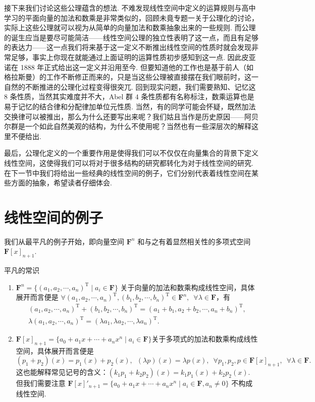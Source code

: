 接下来我们讨论这些公理蕴含的想法. 不难发现线性空间中定义的运算规则与高中学习的平面向量的加法和数乘是非常类似的，回顾未竟专题一关于公理化的讨论，实际上这些公理就可以视为从简单的向量加法和数乘抽象出来的一些规则. 而公理的诞生应当是要尽可能简洁——线性空间公理的独立性表明了这一点，而且有足够的表达力——这一点我们将来基于这一定义不断推出线性空间的性质时就会发现非常足够，事实上你现在就能通过上面证明的运算性质初步感知到这一点. 因此皮亚诺在 1888 年正式给出这一定义并沿用至今. 但要知道他的工作也是基于前人（如格拉斯曼）的工作不断修正而来的，只是当这些公理被直接摆在我们眼前时，这一自然的不断推进的公理化过程变得很突兀. 回到现实问题，我们需要熟知、记忆这 $8$ 条性质，当然其实难度并不大，Abel 群 $4$ 条性质都有名称标注，数乘运算也是易于记忆的结合律和分配律加单位元性质. 当然，有的同学可能会怀疑，既然加法交换律可以被推出，那么为什么还要写出来呢？我们姑且当作是历史原因——阿贝尔群是一个如此自然美观的结构，为什么不使用呢？当然也有一些深层次的解释这里不便给出.

最后，公理化定义的一个重要作用是使得我们可以不仅仅在向量集合的背景下定义线性空间，这使得我们可以将对于很多结构的研究都转化为对于线性空间的研究. 在下一节中我们将给出一些经典的线性空间的例子，它们分别代表着线性空间在某些方面的抽象，希望读者仔细体会.

\section{线性空间的例子}

我们从最平凡的例子开始，即向量空间 $\mathbf{F}^n$ 和与之有着显然相关性的多项式空间 $\mathbf{F}[x]_{n+1}$.
\begin{example}{平凡的常识}{}
    \begin{enumerate}
        \item $\mathbf{F}^n = \{(a_1,a_2,\cdots,a_n)^\mathrm{T} \mid a_i \in \mathbf{F}\}$ 关于向量的加法和数乘构成线性空间，具体展开而言便是 $\forall (a_1,a_2,\cdots,a_n)^\mathrm{T},(b_1,b_2,\cdots,b_n)^\mathrm{T} \in \mathbf{F}^n, \enspace \forall \lambda \in \mathbf{F}$，有
        \begin{gather*}
            (a_1,a_2,\cdots,a_n)^\mathrm{T} + (b_1,b_2,\cdots,b_n)^\mathrm{T} = (a_1+b_1,a_2+b_2,\cdots,a_n+b_n)^\mathrm{T},\\
            \lambda(a_1,a_2,\cdots,a_n)^\mathrm{T} = (\lambda a_1,\lambda a_2,\cdots,\lambda a_n)^\mathrm{T}.
        \end{gather*}
        \item $\mathbf{F}[x]_{n+1}=\{a_0+a_1x+\cdots+a_nx^n \mid a_i\in\mathbf{F}\}$关于多项式的加法和数乘构成线性空间，具体展开而言便是
        \[
            (p_1+p_2)(x)=p_1(x)+p_2(x),\enspace(\lambda p)(x)=\lambda p(x),\enspace\forall p_1,p_2,p\in\mathbf{F}[x]_{n+1},\enspace\forall \lambda\in\mathbf{F}.
        \]
        这也能解释常见记号的含义：$(k_1p_1+k_2p_2)(x)=k_1p_1(x)+k_2p_2(x)$.
        但我们需要注意 $\mathbf{F}[x]'_{n+1}=\{a_0+a_1x+\cdots+a_nx^n \mid a_i\in\mathbf{F}, a_n\neq 0\}$ 不构成线性空间.
    \end{enumerate}
\end{example}

